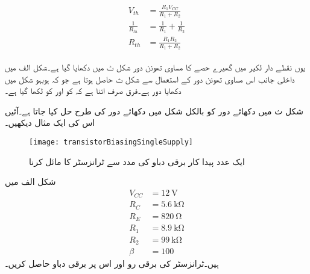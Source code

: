 \begin{gather} \label{مساوات_ٹرانزسٹر_تھونن_دباو_اور_مزاحمت}
\begin{aligned}
V_{th}&=\frac{R_1 V_{CC} }{R_1+R_2}\\
\frac{1}{R_{th}} &=\frac{1}{R_1} +\frac{1}{R_2}\\
R_{th} &=\frac{R_1 R_2 }{R_1+R_2}
\end{aligned}
\end{gather}

یوں نقطے دار لکیر میں گھیرے حصے کا مساوی تھونن دور شکل  ٹ میں دکھایا گیا ہے۔شکل  الف میں داخلی جانب اس مساوی تھونن دور کے استعمال سے شکل  ث حاصل ہوتا ہے جو کہ ہوبہو شکل   میں دکھایا دور ہے۔فرق صرف اتنا ہے کہ  کو  اور  کو  لکھا گیا ہے۔

شکل  ث میں دکھائے دور کو بالکل شکل   میں دکھائے دور کی طرح حل کیا جاتا ہے۔آئیں اس کی ایک مثال دیکھیں۔
\begin{figure}
\centering
\texttt{[image: transistorBiasingSingleSupply]}
\caption{ایک عدد پیدا کار برقی دباو کی مدد سے ٹرانزسٹر کا مائل کرنا}
\label{شکل_ایک_عدد_پیداکار_برقی_دباو_سے_مائل}
\end{figure}

شکل  الف میں
\begin{align*}
V_{CC}&=\SI{12}{\volt}\\
R_C&=\SI{5.6}{\kilo \ohm}\\
R_E&=\SI{820}{\ohm} \\
R_1&=\SI{8.9}{\kilo \ohm}\\
R_2 &=\SI{99}{\kilo \ohm}\\
\beta&=100
\end{align*}
ہیں۔ٹرانزسٹر کی برقی رو  اور اس پر برقی دباو  حاصل کریں۔

